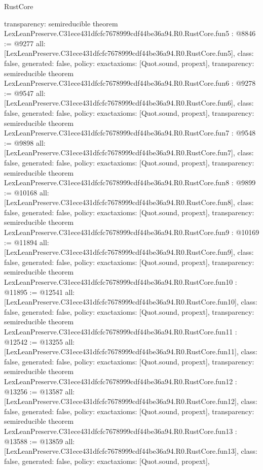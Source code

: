\begin{lexlean}{RustCore}
\begin{coremodule}
{  transparency: semireducible
}
theorem LexLeanPreserve.C31ece431dfcfc7678999cdf44be36a94.R0.RustCore.fun5 : @8846 := @9277 {
  all: [LexLeanPreserve.C31ece431dfcfc7678999cdf44be36a94.R0.RustCore.fun5],
  class: false,
  generated: false,
  policy: exact{axioms: [Quot.sound, propext]},
  transparency: semireducible
}
theorem LexLeanPreserve.C31ece431dfcfc7678999cdf44be36a94.R0.RustCore.fun6 : @9278 := @9547 {
  all: [LexLeanPreserve.C31ece431dfcfc7678999cdf44be36a94.R0.RustCore.fun6],
  class: false,
  generated: false,
  policy: exact{axioms: [Quot.sound, propext]},
  transparency: semireducible
}
theorem LexLeanPreserve.C31ece431dfcfc7678999cdf44be36a94.R0.RustCore.fun7 : @9548 := @9898 {
  all: [LexLeanPreserve.C31ece431dfcfc7678999cdf44be36a94.R0.RustCore.fun7],
  class: false,
  generated: false,
  policy: exact{axioms: [Quot.sound, propext]},
  transparency: semireducible
}
theorem LexLeanPreserve.C31ece431dfcfc7678999cdf44be36a94.R0.RustCore.fun8 : @9899 := @10168 {
  all: [LexLeanPreserve.C31ece431dfcfc7678999cdf44be36a94.R0.RustCore.fun8],
  class: false,
  generated: false,
  policy: exact{axioms: [Quot.sound, propext]},
  transparency: semireducible
}
theorem LexLeanPreserve.C31ece431dfcfc7678999cdf44be36a94.R0.RustCore.fun9 : @10169 := @11894 {
  all: [LexLeanPreserve.C31ece431dfcfc7678999cdf44be36a94.R0.RustCore.fun9],
  class: false,
  generated: false,
  policy: exact{axioms: [Quot.sound, propext]},
  transparency: semireducible
}
theorem LexLeanPreserve.C31ece431dfcfc7678999cdf44be36a94.R0.RustCore.fun10 : @11895 := @12541 {
  all: [LexLeanPreserve.C31ece431dfcfc7678999cdf44be36a94.R0.RustCore.fun10],
  class: false,
  generated: false,
  policy: exact{axioms: [Quot.sound, propext]},
  transparency: semireducible
}
theorem LexLeanPreserve.C31ece431dfcfc7678999cdf44be36a94.R0.RustCore.fun11 : @12542 := @13255 {
  all: [LexLeanPreserve.C31ece431dfcfc7678999cdf44be36a94.R0.RustCore.fun11],
  class: false,
  generated: false,
  policy: exact{axioms: [Quot.sound, propext]},
  transparency: semireducible
}
theorem LexLeanPreserve.C31ece431dfcfc7678999cdf44be36a94.R0.RustCore.fun12 : @13256 := @13587 {
  all: [LexLeanPreserve.C31ece431dfcfc7678999cdf44be36a94.R0.RustCore.fun12],
  class: false,
  generated: false,
  policy: exact{axioms: [Quot.sound, propext]},
  transparency: semireducible
}
theorem LexLeanPreserve.C31ece431dfcfc7678999cdf44be36a94.R0.RustCore.fun13 : @13588 := @13859 {
  all: [LexLeanPreserve.C31ece431dfcfc7678999cdf44be36a94.R0.RustCore.fun13],
  class: false,
  generated: false,
  policy: exact{axioms: [Quot.sound, propext]},
}
\end{coremodule}
\end{lexlean}
